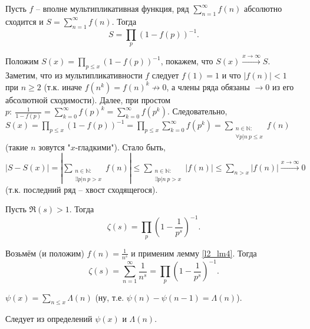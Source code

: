 
\begin{lemma} \label{l2_lm4}
	Пусть $f$ -- вполне мультипликативная функция, ряд $\displaystyle \sum\limits_{n=1}^\infty f(n)$ абсолютно сходится и $\displaystyle S = \sum\limits_{n=1}^\infty f(n)$. Тогда 
	$$S = \prod\limits_p(1-f(p))^{-1}.$$
\end{lemma}
\begin{pf}
	Положим $\displaystyle S(x) = \prod\limits_{p \leq x}(1-f(p))^{-1}$, покажем, что $S(x) \xrightarrow{x\to\infty} S$. Заметим, что из мультипликативности $f$ следует $f(1) = 1$ и что $|f(n)|<1$ при $n \geq 2$ (т.к. иначе $f(n^k)=f(n)^k \not \to 0$, а члены ряда обязаны $\to 0$ из его абсолютной сходимости). Далее, при простом $\displaystyle p: \ \frac{1}{1-f(p)} = \sum\limits_{k=0}^\infty f(p)^k = \sum\limits_{k=0}^\infty f(p^k)$. Следовательно, $\displaystyle S(x) = \prod\limits_{p\leq x} (1-f(p))^{-1} = \prod\limits_{p\leq x}\sum\limits_{k=0}^\infty f(p^k) = \sum\limits_{\substack{n\in\mathbb{N}: \\ \forall p|n \ p \leq x}}f(n)$ (такие $n$ зовутся "$x$-гладкими"). Стало быть, $\displaystyle \left|S-S(x)\right|=\left|\sum\limits_{\substack{n\in\mathbb{N}: \\ \exists p|n \ p > x}}f(n)\right| \leq \sum\limits_{\substack{n\in\mathbb{N}: \\ \exists p|n \ p > x}}\left|f(n)\right| \leq \sum\limits_{n>x}\left|f(n)\right| \xrightarrow{x\to\infty} 0$ (т.к. последний ряд -- хвост сходящегося).
\end{pf}

\begin{theorem} \label{l2_Euler_formula}
	Пусть $\Re(s)>1$. Тогда $$\zeta(s) = \prod\limits_p\left( 1-\frac{1}{p^s}\right)^{-1}.$$
\end{theorem}
\begin{pf} 
	Возьмём (и положим) $\displaystyle f(n) = \frac{1}{n^s}$ и применим лемму \ref{l2_lm4}. Тогда 
		$$\zeta(s) = \sum\limits_{n=1}^\infty \frac{1}{n^s} = \prod\limits_p\left( 1-\frac{1}{p^s} \right)^{-1}.$$
\end{pf}

\begin{lemma} \label{l2_lm5}
	$\displaystyle \psi(x) = \sum\limits_{n \leq x} \Lambda(n)$ (ну, т.е. $\psi(n)-\psi(n-1)=\Lambda(n)$).
\end{lemma}
\begin{pf}
	Следует из определений $\psi(x)$ и $\Lambda(n)$.
\end{pf}
